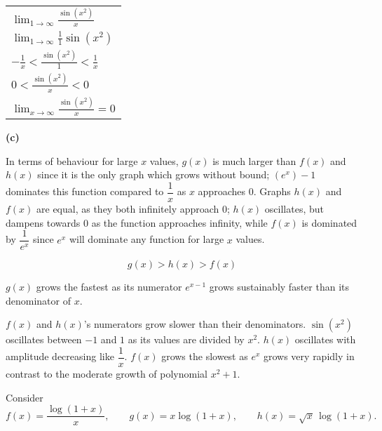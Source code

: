 \documentclass[answers,addpoints]{exam}
\newcommand\pts[1][2]{\textcolor{MyBlue}{\text{\bf [#1 pts]}}}
\begin{document}
\begin{questions}
\begin{solution}
      \begin{center}
        \begin{tabular}{@{}l@{}}
          $\displaystyle \lim_{1 \to \infty}\frac{\sin(x^2)}{x}$ \\[6pt]
          $\displaystyle \lim_{1 \to \infty}\frac{1}{1}\sin(x^2)$ \\[12pt]
          $\displaystyle -\frac{1}{x}<\frac{\sin(x^2)}{1}<\frac{1}{x}$ \\[6pt]
          $\displaystyle 0<\frac{\sin(x^2)}{x}<0$ \\[6pt]
          $\displaystyle \lim_{x \to \infty}\frac{\sin(x^2)}{x}=0$ \\[6pt]
        \end{tabular}
      \end{center}

      \textbf{(c)}

      In terms of behaviour for large $x$ values, $g(x)$ is much larger than $f(x)$ and $h(x)$ since it is the only graph which grows without bound; $(e^x)-1$ dominates this function compared to $\dfrac{1}{x}$ as $x$ approaches $0$. Graphs $h(x)$ and $f(x)$ are equal, as they both infinitely approach $0$; $h(x)$ oscillates, but dampens towards $0$ as the function approaches infinity, while $f(x)$ is dominated by $\dfrac{1}{e^x}$ since $e^x$ will dominate any function for large $x$ values.

      \[
        g(x) > h(x) > f(x)
      \]

      $g(x)$ grows the fastest as its numerator $e^{x-1}$ grows sustainably faster than its denominator of $x$.

      $f(x)$ and $h(x)$’s numerators grow slower than their denominators. $\sin(x^2)$ oscillates between $-1$ and $1$ as its values are divided by $x^2$. $h(x)$ oscillates with amplitude decreasing like $\dfrac{1}{x}$. $f(x)$ grows the slowest as $e^x$ grows very rapidly in contrast to the moderate growth of polynomial $x^{2}+1$.

    \end{solution}


    \question \pts[8]
    Consider
    \[
      f(x)=\frac{\log(1+x)}{x},\qquad
      g(x)=x\log(1+x),\qquad
      h(x)=\sqrt{x}\,\log(1+x).
    \]
\end{questions}
\end{document}
